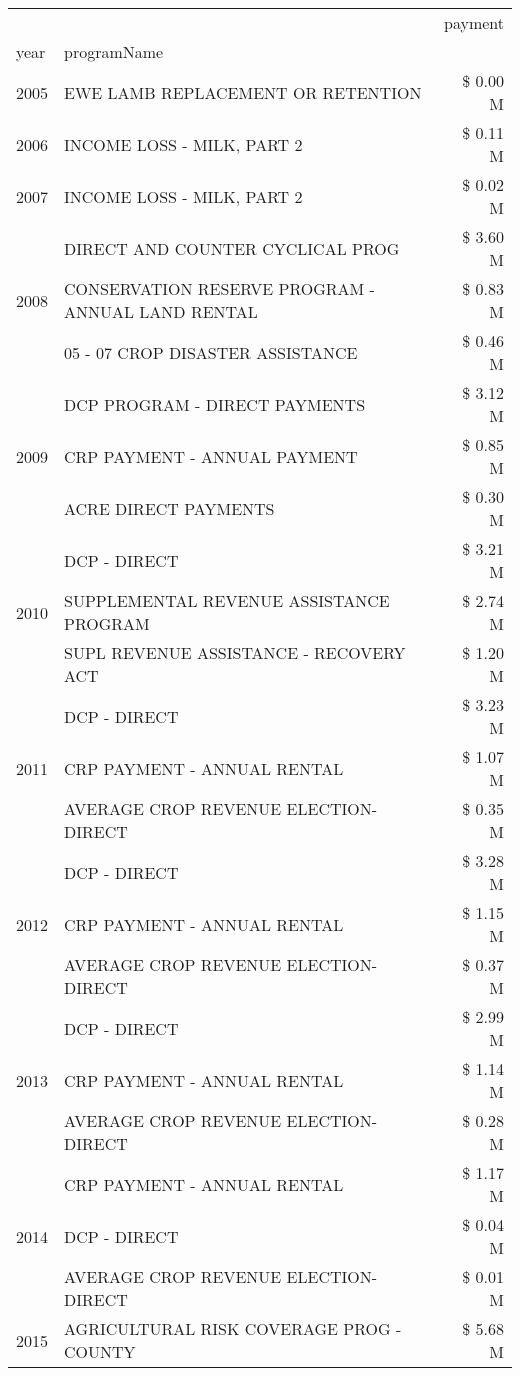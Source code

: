 \begin{tabular}{llr}
\toprule
 &  & payment \\
year & programName &  \\
\midrule
2005 & EWE LAMB REPLACEMENT OR RETENTION & \$ 0.00 M \\
\cline{1-3}
2006 & INCOME LOSS - MILK, PART 2 & \$ 0.11 M \\
\cline{1-3}
2007 & INCOME LOSS - MILK, PART 2 & \$ 0.02 M \\
\cline{1-3}
\multirow[t]{3}{*}{2008} & DIRECT AND COUNTER CYCLICAL PROG & \$ 3.60 M \\
 & CONSERVATION RESERVE PROGRAM - ANNUAL LAND RENTAL & \$ 0.83 M \\
 & 05 - 07 CROP DISASTER ASSISTANCE & \$ 0.46 M \\
\cline{1-3}
\multirow[t]{3}{*}{2009} & DCP PROGRAM - DIRECT PAYMENTS & \$ 3.12 M \\
 & CRP PAYMENT - ANNUAL PAYMENT & \$ 0.85 M \\
 & ACRE DIRECT PAYMENTS & \$ 0.30 M \\
\cline{1-3}
\multirow[t]{3}{*}{2010} & DCP - DIRECT & \$ 3.21 M \\
 & SUPPLEMENTAL REVENUE ASSISTANCE PROGRAM & \$ 2.74 M \\
 & SUPL REVENUE ASSISTANCE - RECOVERY ACT & \$ 1.20 M \\
\cline{1-3}
\multirow[t]{3}{*}{2011} & DCP - DIRECT & \$ 3.23 M \\
 & CRP PAYMENT - ANNUAL RENTAL & \$ 1.07 M \\
 & AVERAGE CROP REVENUE ELECTION-DIRECT & \$ 0.35 M \\
\cline{1-3}
\multirow[t]{3}{*}{2012} & DCP - DIRECT & \$ 3.28 M \\
 & CRP PAYMENT - ANNUAL RENTAL & \$ 1.15 M \\
 & AVERAGE CROP REVENUE ELECTION-DIRECT & \$ 0.37 M \\
\cline{1-3}
\multirow[t]{3}{*}{2013} & DCP - DIRECT & \$ 2.99 M \\
 & CRP PAYMENT - ANNUAL RENTAL & \$ 1.14 M \\
 & AVERAGE CROP REVENUE ELECTION-DIRECT & \$ 0.28 M \\
\cline{1-3}
\multirow[t]{3}{*}{2014} & CRP PAYMENT - ANNUAL RENTAL & \$ 1.17 M \\
 & DCP - DIRECT & \$ 0.04 M \\
 & AVERAGE CROP REVENUE ELECTION-DIRECT & \$ 0.01 M \\
\cline{1-3}
\multirow[t]{3}{*}{2015} & AGRICULTURAL RISK COVERAGE PROG - COUNTY & \$ 5.68 M \\

\end{tabular}
